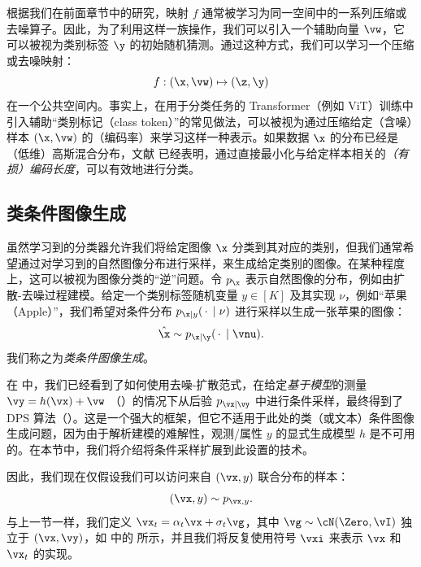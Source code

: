 \documentclass[../../book-main_zh.tex]{subfiles}
\begin{document}
根据我们在前面章节中的研究，映射 $f$ 通常被学习为同一空间中的一系列压缩或去噪算子。因此，为了利用这样一族操作，我们可以引入一个辅助向量 $\vw$，它可以被视为类别标签 $\y$ 的初始随机猜测。通过这种方式，我们可以学习一个压缩或去噪映射：
\begin{equation}\label{eq:classifier-with-class-token}
    f: (\x, \vw) \mapsto (\z, \y)
\end{equation}
在一个公共空间内。事实上，在用于分类任务的 Transformer（例如 ViT）训练中引入辅助“类别标记（class token）”的常见做法，可以被视为通过压缩给定（含噪）样本 $(\x, \vw)$ 的（编码率）来学习这样一种表示。如果数据 $\x$ 的分布已经是（低维）高斯混合分布，文献
\cite{wright2008classification} 已经表明，通过直接最小化与给定样本相关的\emph{（有损）编码长度}，可以有效地进行分类。

\subsection{类条件图像生成}\label{sub:cfg}
虽然学习到的分类器允许我们将给定图像 $\x$ 分类到其对应的类别，但我们通常希望通过对学习到的自然图像分布进行采样，来生成给定类别的图像。在某种程度上，这可以被视为图像分类的“逆”问题。令 $p_{\x}$ 表示自然图像的分布，例如由扩散-去噪过程建模。给定一个类别标签随机变量 $y \in [K]$ 及其实现 $\nu$，例如“苹果（Apple）”，我们希望对条件分布 $p_{\x \mid
y}(\,\cdot\, \mid \nu)$ 进行采样以生成一张苹果的图像：
\begin{equation}
    \hat{\x} \sim p_{\x\mid \y}(\,\cdot\, \mid \vnu).
\end{equation}
我们称之为\emph{类条件图像生成}。

在  中，我们已经看到了如何使用去噪-扩散范式，在给定\textit{基于模型}的测量 $\vy = h(\vx) + \vw$
（）的情况下从后验 $p_{\vx \mid \vy}$ 中进行条件采样，最终得到了
DPS 算法（）。这是一个强大的框架，但它不适用于此处的类（或文本）条件图像生成问题，因为由于解析建模的难解性，观测/属性 $y$ 的显式生成模型 $h$ 是不可用的。在本节中，我们将介绍将条件采样扩展到此设置的技术。

因此，我们现在仅假设我们可以访问来自 $(\vx, y)$ 联合分布的样本：
\begin{equation}
    (\vx, y) \sim p_{\vx, y}.
\end{equation}
与上一节一样，我们定义 $\vx_t = \alpha_t \vx + \sigma_t \vg$，其中 $\vg \sim \cN(\Zero, \vI)$ 独立于 $(\vx, \vy)$，如  中的
 所示，并且我们将反复使用符号 $\vxi$ 来表示 $\vx$ 和 $\vx_t$ 的实现。
\end{document}
